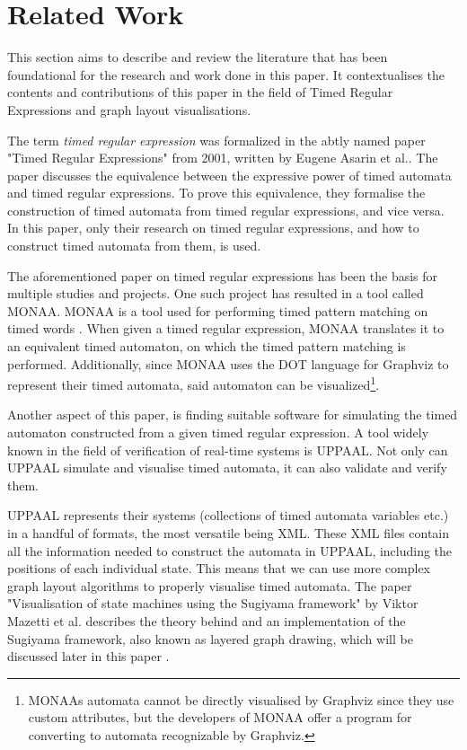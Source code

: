 \section{Related Work}



This section aims to describe and review the literature that has been foundational for the research and work done in this paper. It contextualises the contents and contributions of this paper in the field of Timed Regular Expressions and graph layout visualisations.

The term \textit{timed regular expression} was formalized in the abtly named paper "Timed Regular Expressions" from 2001, written by Eugene Asarin et al.\cite{Eugene2001}. The paper discusses the equivalence between the expressive power of timed automata\cite{ALUR1994} and timed regular expressions. To prove this equivalence, they formalise the construction of timed automata from timed regular expressions, and vice versa. In this paper, only their research on timed regular expressions, and how to construct timed automata from them, is used.

The aforementioned paper on timed regular expressions has been the basis for multiple studies and projects. One such project has resulted in a tool called MONAA. MONAA is a tool used for performing timed pattern matching on timed words \cite{MONAA2017}. When given a timed regular expression, MONAA translates it to an equivalent timed automaton, on which the timed pattern matching is performed. Additionally, since MONAA uses the DOT language for Graphviz \cite{Graphviz} to represent their timed automata, said automaton can be visualized\footnote{MONAAs automata cannot be directly visualised by Graphviz since they use custom attributes, but the developers of MONAA offer a program for converting to automata recognizable by Graphviz\cite{MONAA2017}.}.

Another aspect of this paper, is finding suitable software for simulating the timed automaton constructed from a given timed regular expression. A tool widely known in the field of verification of real-time systems is UPPAAL. Not only can UPPAAL simulate and visualise timed automata, it can also validate and verify them\cite{UPPAAL}.

UPPAAL represents their systems (collections of timed automata variables etc.) in a handful of formats, the most versatile being XML\cite{UPPAAL}. These XML files contain all the information needed to construct the automata in UPPAAL, including the positions of each individual state. This means that we can use more complex graph layout algorithms to properly visualise timed automata. The paper "Visualisation of state machines using the Sugiyama framework" by Viktor Mazetti et al. describes the theory behind and an implementation of the Sugiyama framework, also known as layered graph drawing, which will be discussed later in this paper \cite{Mazetti2012}.